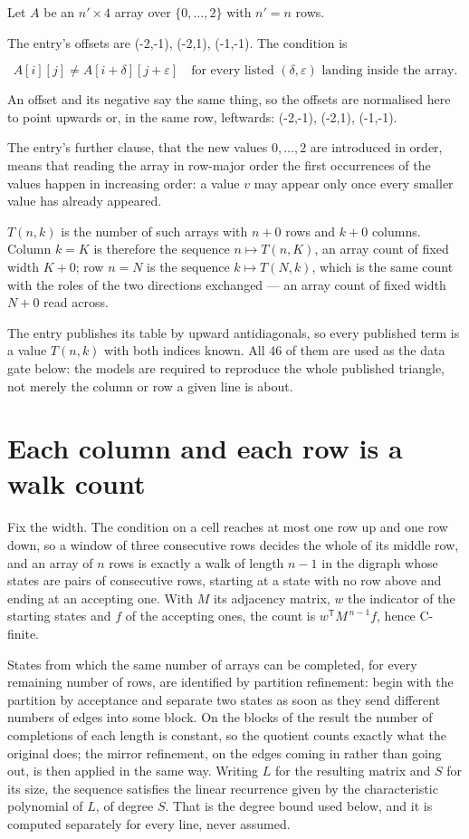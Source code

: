 \documentclass[11pt]{article}
\theoremstyle{definition}
\begin{document}
Let $A$ be an $n' \times 4$ array over $\{0,\dots,2\}$ with $n' = n$ rows.

The entry's offsets are (-2,-1), (-2,1), (-1,-1). The condition is

\[A[i][j] \ne A[i{+}\delta][j{+}\varepsilon]\quad\text{for every listed }(\delta,\varepsilon)\text{ landing inside the array.}\]

An offset and its negative say the same thing, so the offsets are normalised here to point upwards or, in the same row, leftwards: (-2,-1), (-2,1), (-1,-1).

The entry's further clause, that the new values $0,\dots,2$ are introduced in order, means that reading the array in row-major order the first occurrences of the values happen in increasing order: a value $v$ may appear only once every smaller value has already appeared.

$T(n,k)$ is the number of such arrays with $n + 0$ rows and $k + 0$ columns. Column $k = K$ is therefore the sequence $n \mapsto T(n,K)$, an array count of fixed width $K + 0$; row $n = N$ is the sequence $k \mapsto T(N,k)$, which is the same count with the roles of the two directions exchanged --- an array count of fixed width $N + 0$ read across.

The entry publishes its table by upward antidiagonals, so every published term is a value $T(n,k)$ with both indices known. All 46 of them are used as the data gate below: the models are required to reproduce the whole published triangle, not merely the column or row a given line is about.

\section{Each column and each row is a walk count}

Fix the width. The condition on a cell reaches at most one row up and one row down, so a window of three consecutive rows decides the whole of its middle row, and an array of $n$ rows is exactly a walk of length $n-1$ in the digraph whose states are pairs of consecutive rows, starting at a state with no row above and ending at an accepting one. With $M$ its adjacency matrix, $w$ the indicator of the starting states and $f$ of the accepting ones, the count is $w^{\mathsf T}M^{\,n-1}f$, hence C-finite.

States from which the same number of arrays can be completed, for every remaining number of rows, are identified by partition refinement: begin with the partition by acceptance and separate two states as soon as they send different numbers of edges into some block. On the blocks of the result the number of completions of each length is constant, so the quotient counts exactly what the original does; the mirror refinement, on the edges coming in rather than going out, is then applied in the same way. Writing $L$ for the resulting matrix and $S$ for its size, the sequence satisfies the linear recurrence given by the characteristic polynomial of $L$, of degree $S$. That is the degree bound used below, and it is computed separately for every line, never assumed.
\end{document}
